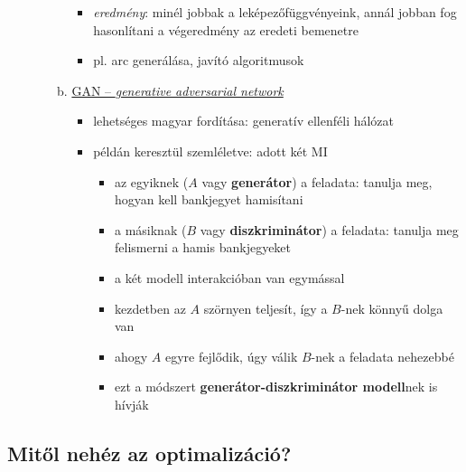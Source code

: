 \documentclass[a4paper, 11pt]{article}
\begin{document}
\begin{enumerate}[A)]
\begin{itemize}
\begin{enumerate}[(a)]
\begin{itemize}
				\item \textit{eredmény}: minél jobbak a leképezőfüggvényeink, annál jobban fog hasonlítani a végeredmény az eredeti bemenetre
				\item pl. arc generálása, javító algoritmusok
			\end{itemize}
			\item \underline{GAN -- \textit{generative adversarial network}}
			\begin{itemize}
				\item lehetséges magyar fordítása: generatív ellenféli hálózat
				\item példán keresztül szemléletve: adott két MI
				\begin{itemize}
					\item az egyiknek ($A$ vagy \textbf{generátor}) a feladata: tanulja meg, hogyan kell bankjegyet hamisítani
					\item a másiknak ($B$ vagy \textbf{diszkriminátor}) a feladata: tanulja meg felismerni a hamis bankjegyeket
					\item a két modell interakcióban van egymással
					\item kezdetben az $A$ szörnyen teljesít, így a $B$-nek könnyű dolga van
					\item ahogy $A$ egyre fejlődik, úgy válik $B$-nek a feladata nehezebbé
					\item ezt a módszert \textbf{generátor-diszkriminátor modell}nek is hívják
				\end{itemize}
			\end{itemize}
		\end{enumerate}
	\end{itemize}
\end{enumerate}

\subsection{Mitől nehéz az optimalizáció?}
\end{document}
